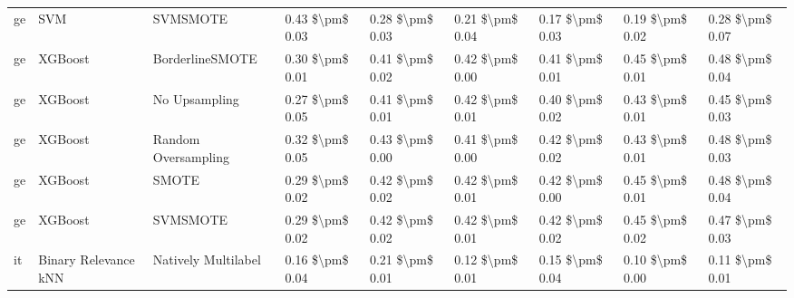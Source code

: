 \begin{tabular}{lllllllll}
      ge &                             SVM &                      SVMSMOTE & 0.43 \$\textbackslash pm\$ 0.03 &           0.28 \$\textbackslash pm\$ 0.03 &       0.21 \$\textbackslash pm\$ 0.04 &        0.17 \$\textbackslash pm\$ 0.03 &                         0.19 \$\textbackslash pm\$ 0.02 &     0.28 \$\textbackslash pm\$ 0.07 \\
      ge &                         XGBoost &               BorderlineSMOTE & 0.30 \$\textbackslash pm\$ 0.01 &           0.41 \$\textbackslash pm\$ 0.02 &       0.42 \$\textbackslash pm\$ 0.00 &        0.41 \$\textbackslash pm\$ 0.01 &                         0.45 \$\textbackslash pm\$ 0.01 &     0.48 \$\textbackslash pm\$ 0.04 \\
      ge &                         XGBoost &                 No Upsampling & 0.27 \$\textbackslash pm\$ 0.05 &           0.41 \$\textbackslash pm\$ 0.01 &       0.42 \$\textbackslash pm\$ 0.01 &        0.40 \$\textbackslash pm\$ 0.02 &                         0.43 \$\textbackslash pm\$ 0.01 &     0.45 \$\textbackslash pm\$ 0.03 \\
      ge &                         XGBoost &           Random Oversampling & 0.32 \$\textbackslash pm\$ 0.05 &           0.43 \$\textbackslash pm\$ 0.00 &       0.41 \$\textbackslash pm\$ 0.00 &        0.42 \$\textbackslash pm\$ 0.02 &                         0.43 \$\textbackslash pm\$ 0.01 &     0.48 \$\textbackslash pm\$ 0.03 \\
      ge &                         XGBoost &                         SMOTE & 0.29 \$\textbackslash pm\$ 0.02 &           0.42 \$\textbackslash pm\$ 0.02 &       0.42 \$\textbackslash pm\$ 0.01 &        0.42 \$\textbackslash pm\$ 0.00 &                         0.45 \$\textbackslash pm\$ 0.01 &     0.48 \$\textbackslash pm\$ 0.04 \\
      ge &                         XGBoost &                      SVMSMOTE & 0.29 \$\textbackslash pm\$ 0.02 &           0.42 \$\textbackslash pm\$ 0.02 &       0.42 \$\textbackslash pm\$ 0.01 &        0.42 \$\textbackslash pm\$ 0.02 &                         0.45 \$\textbackslash pm\$ 0.02 &     0.47 \$\textbackslash pm\$ 0.03 \\
      it &            Binary Relevance kNN &           Natively Multilabel & 0.16 \$\textbackslash pm\$ 0.04 &           0.21 \$\textbackslash pm\$ 0.01 &       0.12 \$\textbackslash pm\$ 0.01 &        0.15 \$\textbackslash pm\$ 0.04 &                         0.10 \$\textbackslash pm\$ 0.00 &     0.11 \$\textbackslash pm\$ 0.01 \\

\end{tabular}
